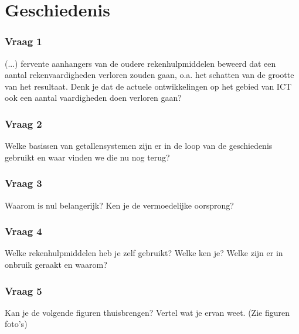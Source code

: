 \documentclass[../main.tex]{subfiles}
\begin{document}
\section{Geschiedenis} %
\label{sec:geschiedenis}


\subsubsection{Vraag 1}
\begin{question}(...) fervente aanhangers van de oudere rekenhulpmiddelen beweerd dat een aantal rekenvaardigheden verloren zouden gaan, o.a. het schatten van de grootte van het resultaat. Denk je dat de actuele ontwikkelingen op het gebied van ICT ook een aantal vaardigheden doen verloren gaan?
\end{question}

\begin{solution}
\lipsum[1]
\end{solution}

\subsubsection{Vraag 2}
\begin{question}
Welke basissen van getallensystemen zijn er in de loop van de geschiedenis gebruikt en waar vinden we die nu nog terug?
\end{question}

\subsubsection{Vraag 3}
\begin{question}
Waarom is nul belangerijk? Ken je de vermoedelijke oorsprong?
\end{question}

\subsubsection{Vraag 4}
\begin{question}
Welke rekenhulpmiddelen heb je zelf gebruikt? Welke ken je? Welke zijn er in onbruik geraakt en waarom?
\end{question}

\subsubsection{Vraag 5}
\begin{question}
Kan je de volgende figuren thuisbrengen? Vertel wat je ervan weet. (Zie figuren foto’s)
\end{question}
\end{document}
